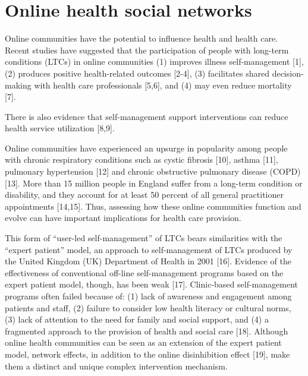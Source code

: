 
\chapter{Online health social networks}

Online communities have the potential to influence health and health care. Recent studies have suggested that the participation of people with long-term conditions (LTCs) in online communities (1) improves illness self-management [1], (2) produces positive health-related outcomes [2-4], (3) facilitates shared decision-making with health care professionals [5,6], and (4) may even reduce mortality [7].

There is also evidence that self-management support interventions can reduce health service utilization [8,9].

Online communities have experienced an upsurge in popularity among people with chronic respiratory conditions such as cystic fibrosis [10], asthma [11], pulmonary hypertension [12] and chronic obstructive pulmonary disease (COPD) [13]. More than 15 million people in England suffer from a long-term condition or disability, and they account for at least 50 percent of all general practitioner appointments [14,15]. Thus, assessing how these online communities function and evolve can have important implications for health care provision.

This form of “user-led self-management” of LTCs bears similarities with the “expert patient” model, an approach to self-management of LTCs produced by the United Kingdom (UK) Department of Health in 2001 [16]. Evidence of the effectiveness of conventional off-line self-management programs based on the expert patient model, though, has been weak [17]. Clinic-based self-management programs often failed because of: (1) lack of awareness and engagement among patients and staff, (2) failure to consider low health literacy or cultural norms, (3) lack of attention to the need for family and social support, and (4) a fragmented approach to the provision of health and social care [18]. Although online health communities can be seen as an extension of the expert patient model, network effects, in addition to the online disinhibition effect [19], make them a distinct and unique complex intervention mechanism.

